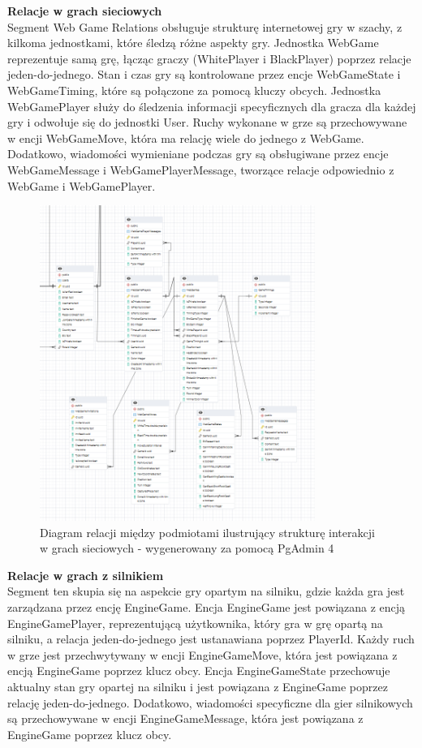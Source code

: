 \documentclass[12pt,a4paper]{article}
\begin{document}
\noindent \textbf{Relacje w grach sieciowych} \\
Segment Web Game Relations obsługuje strukturę internetowej gry w szachy, z kilkoma jednostkami, które śledzą różne aspekty gry. Jednostka WebGame reprezentuje samą grę, łącząc graczy (WhitePlayer i BlackPlayer) poprzez relacje jeden-do-jednego. Stan i czas gry są kontrolowane przez encje WebGameState i WebGameTiming, które są połączone za pomocą kluczy obcych. Jednostka WebGamePlayer służy do śledzenia informacji specyficznych dla gracza dla każdej gry i odwołuje się do jednostki User. Ruchy wykonane w grze są przechowywane w encji WebGameMove, która ma relację wiele do jednego z WebGame. Dodatkowo, wiadomości wymieniane podczas gry są obsługiwane przez encje WebGameMessage i WebGamePlayerMessage, tworzące relacje odpowiednio z WebGame i WebGamePlayer.

\vspace{1cm}
\begin{figure}[h!]
    \centering
    \includegraphics[width=0.8\textwidth]{zdj/online_ERD.png}
    \caption{Diagram relacji między podmiotami ilustrujący strukturę interakcji w grach sieciowych - wygenerowany za pomocą PgAdmin 4}
\end{figure}
\newpage

\noindent \textbf{Relacje w grach z silnikiem} \\
Segment ten skupia się na aspekcie gry opartym na silniku, gdzie każda gra jest zarządzana przez encję EngineGame. Encja EngineGame jest powiązana z encją EngineGamePlayer, reprezentującą użytkownika, który gra w grę opartą na silniku, a relacja jeden-do-jednego jest ustanawiana poprzez PlayerId. Każdy ruch w grze jest przechwytywany w encji EngineGameMove, która jest powiązana z encją EngineGame poprzez klucz obcy. Encja EngineGameState przechowuje aktualny stan gry opartej na silniku i jest powiązana z EngineGame poprzez relację jeden-do-jednego. Dodatkowo, wiadomości specyficzne dla gier silnikowych są przechowywane w encji EngineGameMessage, która jest powiązana z EngineGame poprzez klucz obcy.
\end{document}
